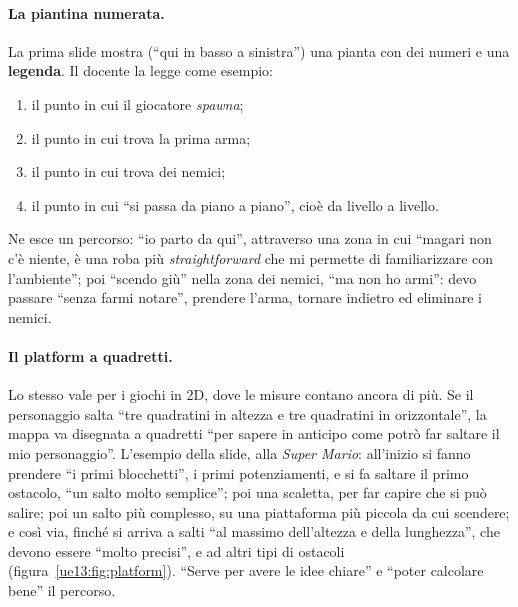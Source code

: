 \paragraph{La piantina numerata.} La prima slide mostra (``qui in basso a sinistra'') una
pianta con dei numeri e una \textbf{legenda}. Il docente la legge come esempio:
\begin{enumerate}
  \item il punto in cui il giocatore \emph{spawna};
  \item il punto in cui trova la prima arma;
  \item il punto in cui trova dei nemici;
  \item il punto in cui ``si passa da piano a piano'', cioè da livello a livello.
\end{enumerate}
Ne esce un percorso: ``io parto da qui'', attraverso una zona in cui ``magari non c'è
niente, è una roba più \emph{straightforward} che mi permette di familiarizzare con
l'ambiente''; poi ``scendo giù'' nella zona dei nemici, ``ma non ho armi'': devo passare
``senza farmi notare'', prendere l'arma, tornare indietro ed eliminare i nemici.

\paragraph{Il platform a quadretti.} Lo stesso vale per i giochi in 2D, dove le misure
contano ancora di più. Se il personaggio salta ``tre quadratini in altezza e tre
quadratini in orizzontale'', la mappa va disegnata a quadretti ``per sapere in anticipo
come potrò far saltare il mio personaggio''. L'esempio della slide, alla \emph{Super
Mario}: all'inizio si fanno prendere ``i primi blocchetti'', i primi potenziamenti, e si fa
saltare il primo ostacolo, ``un salto molto semplice''; poi una scaletta, per far capire
che si può salire; poi un salto più complesso, su una piattaforma più piccola da cui
scendere; e così via, finché si arriva a salti ``al massimo dell'altezza e della
lunghezza'', che devono essere ``molto precisi'', e ad altri tipi di ostacoli
(figura~\ref{ue13:fig:platform}). ``Serve per avere le idee chiare'' e ``poter calcolare
bene'' il percorso.

